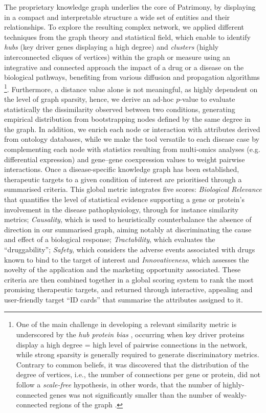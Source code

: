 The proprietary knowledge graph  underlies the core of Patrimony, by displaying in a compact and interpretable structure a wide set of entities and their relationships. To explore the resulting complex network, we applied different techniques from the graph theory and statistical field, which enable to identify \emph{hubs} (key driver genes displaying a high degree) and \emph{clusters} (highly interconnected cliques of vertices) within the graph or measure using an integrative and connected approach the impact of a drug or a disease on the biological pathways, benefiting from various diffusion and propagation algorithms \footnote{One of the main challenge in developing a relevant similarity metric is underscored by the \emph{hub protein bias} \autocite{fiscon_etal21}, occurring when key driver proteins display a high degree = high level of pairwise connections in the network, while strong sparsity is generally required to generate discriminatory metrics. Contrary to common beliefs, it was discovered that the distribution of the degree of vertices, i.e., the number of connections per gene or protein, did not follow a \emph{scale-free} hypothesis, in other words, that the number of highly-connected genes was not significantly smaller than the number of weakly-connected regions of the graph \autocite{broido_clauset19}.}. Furthermore, a distance value alone is not meaningful, as highly dependent on the level of graph sparsity, hence, we derive an ad-hoc $p$-value to evaluate statistically the dissimilarity observed between two conditions, generating empirical distribution from bootstrapping nodes defined by the same degree in the graph. In addition, we enrich each node or interaction with attributes derived from ontology databases, while we make the tool versatile to each disease case by complementing each node with statistics resulting from multi-omics analyses (e.g. differential expression) and gene–gene coexpression values to weight pairwise interactions.
Once a disease-specific knowledge graph has been established, therapeutic targets to a given condition of interest are prioritised through a summarised criteria. This global metric integrates five scores: \emph{Biological Relevance} that quantifies the level of statistical evidence supporting a gene or protein's involvement in the disease pathophysiology, through for instance similarity metrics; \emph{Causality}, which is used to heuristically counterbalance the absence of direction in our summarised graph, aiming notably at discriminating the cause and effect of a biological response; \emph{Tractability}, which evaluates the \enquote{druggability}; \emph{Safety}, which considers the adverse events associated with drugs known to bind to the target of interest and \emph{Innovativeness}, which assesses the novelty of the application and the marketing opportunity associated. These criteria are then combined together in a global scoring system to rank the most promising therapeutic targets, and returned through interactive, appealing and user-friendly target \enquote{ID cards} that summarise the attributes assigned to it.
